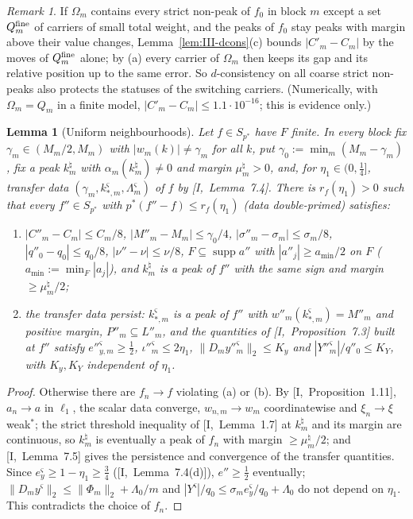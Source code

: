 \documentclass[10pt]{amsart}
\newtheorem{lemma}[theorem]{Lemma}
\theoremstyle{definition}
\theoremstyle{remark}
\newtheorem{remark}[theorem]{Remark}
\newcommand{\supp}{\operatorname{supp}}
\begin{document}
\begin{remark}\label{rem:III-freeze}
If $\Omega_m$ contains every strict non-peak of $f_0$ in block $m$ except a set
$Q^{\rm fine}_m$ of carriers of small total weight, and the peaks of $f_0$ stay
peaks with margin above their value changes, Lemma~\ref{lem:III-dcons}(c)
bounds $|C'_m-C_m|$ by the moves of $Q^{\rm fine}_m$ alone; by (a) every
carrier of $\Omega_m$ then keeps its gap and its relative position up to the same
error.  So $d$-consistency on all coarse strict non-peaks also protects the
statuses of the switching carriers.  (Numerically, with $\Omega_m=Q_m$ in a
finite model, $|C'_m-C_m|\le1.1\cdot10^{-16}$; this is evidence only.)
\end{remark}

\begin{lemma}[Uniform neighbourhoods]\label{lem:III-ball}
Let $f\in S_{p^*}$ have $F$ finite.  In every block fix $\gamma_m\in(M_m/2,M_m)$
with $|w_m(k)|\ne\gamma_m$ for all $k$, put $\gamma_0:=\min_m(M_m-\gamma_m)$,
fix a peak $k^\natural_m$ with $\alpha_m(k^\natural_m)\ne0$ and margin
$\mu^\natural_m>0$, and, for $\eta_1\in(0,\frac14]$, transfer data
$(\gamma_m,k^\varsigma_{*,m},\Lambda^\varsigma_m)$ of $f$ by [I,~Lemma~7.4].
There is $r_f(\eta_1)>0$ such that every $f''\in S_{p^*}$ with
$p^*(f''-f)\le r_f(\eta_1)$ \textup{(}data double-primed\textup{)} satisfies:
\begin{enumerate}
\item[(a)] $|C''_m-C_m|\le C_m/8$, $|M''_m-M_m|\le\gamma_0/4$,
$|\sigma''_m-\sigma_m|\le\sigma_m/8$, $|q''_0-q_0|\le q_0/8$,
$|\nu''-\nu|\le\nu/8$, $F\subseteq\supp a''$ with $|a''_j|\ge a_{\min}/2$ on
$F$ \textup{(}$a_{\min}:=\min_F|a_j|$\textup{)}, and $k^\natural_m$ is a peak of
$f''$ with the same sign and margin $\ge\mu^\natural_m/2$;
\item[(b)] the transfer data persist: $k^\varsigma_{*,m}$ is a peak of $f''$
with $w''_m(k^\varsigma_{*,m})=M''_m$ and positive margin, $P''_m\subseteq
L''_m$, and the quantities of [I,~Proposition~7.3] built at $f''$ satisfy
$e''^\varsigma_{y,m}\ge\frac12$, $\iota''^\varsigma_m\le2\eta_1$,
$\|D_my''^\varsigma_m\|_2\le K_y$ and $|Y''^\varsigma_m|/q''_0\le K_Y$, with
$K_y,K_Y$ independent of $\eta_1$.
\end{enumerate}
\end{lemma}

\begin{proof}
Otherwise there are $f_n\to f$ violating (a) or (b).  By
[I,~Proposition~1.11], $a_n\to a$ in $\ell_1$, the scalar data converge,
$w_{n,m}\to w_m$ coordinatewise and $\xi_n\to\xi$ weak$^*$; the strict threshold
inequality of [I,~Lemma~1.7] at $k^\natural_m$ and its margin are continuous,
so $k^\natural_m$ is eventually a peak of $f_n$ with margin $\ge
\mu^\natural_m/2$; and [I,~Lemma~7.5] gives the persistence and convergence of
the transfer quantities.  Since $e^\varsigma_y\ge1-\eta_1\ge\frac34$
([I,~Lemma~7.4(d)]), $e''\ge\frac12$ eventually; $\|D_my^\varsigma\|_2\le
\|\Phi_m\|_2+\Lambda_0/m$ and $|Y^\varsigma|/q_0\le\sigma_me^\varsigma_y/q_0+
\Lambda_0$ do not depend on $\eta_1$.  This contradicts the choice of $f_n$.
\end{proof}
\end{document}

